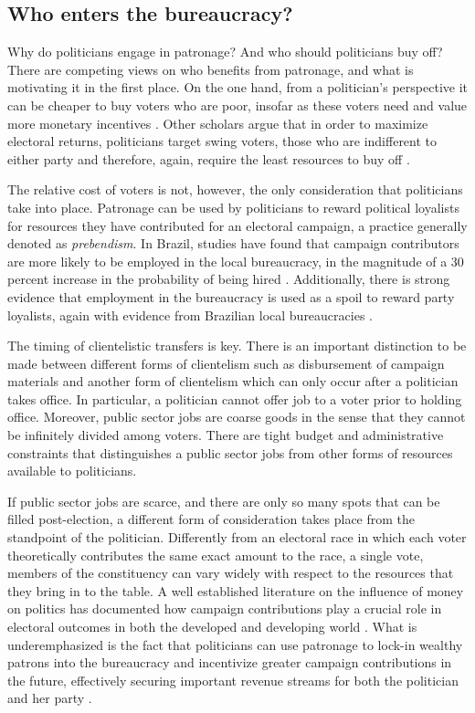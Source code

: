 \documentclass[12pt,a4paper]{article}
\begin{document}
\subsection{Who enters the bureaucracy?}

Why do politicians engage in patronage? And who should politicians buy off? There are competing views on who benefits from patronage, and what is motivating it in the first place. On the one hand, from a politician's perspective it can be cheaper to buy voters who are poor, insofar as these voters need and value more monetary incentives \citet{stokes2013brokers}. Other scholars argue that in order to maximize electoral returns, politicians target swing voters, those who are indifferent to either party and therefore, again, require the least resources to buy off \citet{dixit1996determinants}.

The relative cost of voters is not, however, the only consideration that politicians take into place. Patronage can be used by politicians to reward political loyalists for resources they have contributed for an electoral campaign, a practice generally denoted as \emph{prebendism}\citep{van2007meet}. In Brazil, studies have found that campaign contributors are more likely to be employed in the local bureaucracy, in the magnitude of a 30 percent increase in the probability of being hired \citep{colonnelli2018patronage}. Additionally, there is strong evidence that employment in the bureaucracy is used as a spoil to reward party loyalists, again with evidence from Brazilian local bureaucracies \citep{brollo2017victor}.

The timing of clientelistic transfers is key. There is an important distinction to be made between different forms of clientelism such as disbursement of campaign materials \citep{stokes2005perverse,nichter2008vote} and another form of clientelism which can only occur after a politician takes office. In particular, a politician cannot offer job to a voter prior to holding office. Moreover, public sector jobs are coarse goods in the sense that they cannot be infinitely divided among voters. There are tight budget and administrative constraints that distinguishes a public sector jobs from other forms of resources available to politicians.

If public sector jobs are scarce, and there are only so many spots that can be filled post-election, a different form of consideration takes place from the standpoint of the politician. Differently from an electoral race in which each voter theoretically contributes the same exact amount to the race, a single vote, members of the constituency can vary widely with respect to the resources that they bring in to the table. A well established literature on the influence of money on politics has documented how campaign contributions play a crucial role in electoral outcomes in both the developed and developing world \citep{claessens2008political}. What is underemphasized is the fact that politicians can use patronage to lock-in wealthy patrons into the bureaucracy and incentivize greater campaign contributions in the future, effectively securing important revenue streams for both the politician and her party \citep{robinson2013political}.
\end{document}
